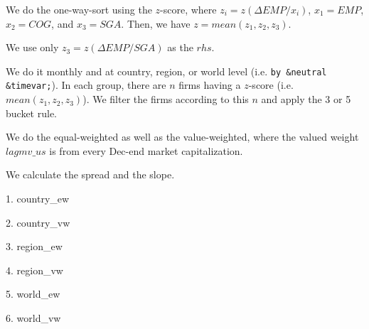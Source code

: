 





\thispagestyle{fancy}

\newcommand{\code}{\texttt}
\newcommand*{\Commonpath}{20181204/SGA}
{}

We do the one-way-sort using the $z$-score, where $z_i = z(\Delta EMP/x_i)$, $x_1 = EMP$, $x_2 = COG$, and $x_3 = SGA$. Then, we have $z = mean(z_1, z_2, z_3)$.

We use only $z_3 = z(\Delta EMP/SGA)$ as the $rhs$.


We do it monthly and at country, region, or world level (i.e. \code{by \&neutral \&timevar;}). In each group, there are $n$ firms having a $z$-score (i.e. $mean(z_1, z_2, z_3)$). We filter the firms according to this $n$ and apply the 3 or 5 bucket rule.

We do the equal-weighted as well as the value-weighted, where the valued weight $lagmv\_us$ is from every Dec-end market capitalization.

We calculate the spread and the slope.

1. country\_ew


2. country\_vw


3. region\_ew


4. region\_vw


5. world\_ew


6. world\_vw



